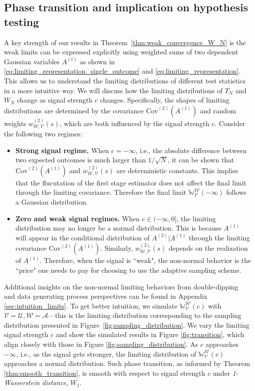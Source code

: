 \documentclass[12pt]{article}
\begin{document}
\subsection{Phase transition and implication on hypothesis testing}
\label{sec:phase_transition}
A key strength of our results in Theorem~\ref{thm:weak_convergence_W_N} is the weak limits can be expressed explicitly using weighted sums of two dependent Gaussian variables $A^{(t)}$ as shown in \eqref{eq:limiting_representation_single_outcome} and \eqref{eq:limiting_representation}. This allows us to understand the limiting distributions of different test statistics in a more intuitive way. We will discuss how the limiting distributions of $T_N$ and $W_N$ change as signal strength $c$ changes. Specifically, the shapes of limiting distributions are determined by the covariance $\mathrm{Cov}^{(2)}(A^{(1)})$ and random weights $w_{\mathcal{W},\mathcal{V}}^{(2)}(s)$, which are both influenced by the signal strength \( c \). Consider the following two regimes:
\begin{itemize}
	\item \textbf{Strong signal regime.} When $c=-\infty$, i.e., the absolute difference between two expected outcomes is much larger than $1/\sqrt{N}$, it can be shown that $\mathrm{Cov}^{(2)}(A^{(1)})$ and $w_{\mathcal{W},\mathcal{V}}^{(2)}(s)$ are deterministic constants. This implies that the flucutation of the first stage estimator does not affect the final limit through the limiting covariance. Therefore the final limit $\mathbb{W}_{\mathcal{V}}^{\mathcal{W}}(-\infty)$ follows a Gaussian distribution.   
	\item \textbf{Zero and weak signal regimes.} When $c\in (-\infty,0]$, the limiting distribution may no longer be a normal distribution. This is because $A^{(1)}$ will appear in the conditional distribution of $A^{(2)}|A^{(1)}$ through the limiting covariance $\mathrm{Cov}^{(2)}(A^{(1)})$. Similarly, $w_{\mathcal{W},\mathcal{V}}^{(2)}(s)$ depends on the realization of $A^{(1)}$. Therefore, when the signal is ``weak", the non-normal behavior is the ``price" one needs to pay for choosing to use the adaptive sampling scheme.
\end{itemize}

Additional insights on the non-normal limiting behaviors from double-dipping and data generating process perspectives can be found in Appendix \ref{sec:intuition_limits}. To get better intuition, 
we simulate $\mathbb{W}_{\mathcal{V}}^{\mathcal{W}}(c)$ 
with $\mathcal{V}=\mathcal{U},\mathcal{W}=\mathcal{A}$---this is the limiting distribution 
corresponding to the sampling distribution presented in Figure~\ref{fig:sampling_distribution}. 
We vary the limiting signal strength $c$ and show the simulated results in Figure \ref{fig:transition}, 
which align closely with those in Figure \ref{fig:sampling_distribution}. 
As $c$ approaches $-\infty$, i.e., as the signal gets stronger, the limiting distribution of $\mathbb{W}_{\mathcal{V}}^{\mathcal{W}}(c)$ 
approaches a normal distribution. Such phase transition, as informed by Theorem \ref{thm:smooth_transition}, is smooth with respect to signal strength $c$ under \textit{1-Wasserstein distance}, $W_1$.
\end{document}
